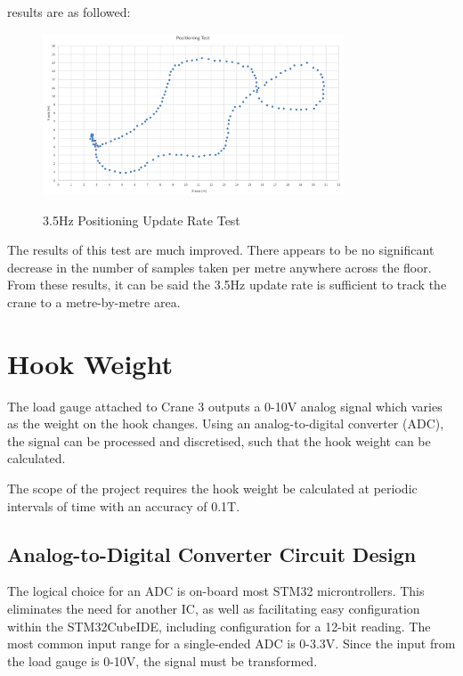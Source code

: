 \documentclass[12pt, a4paper]{article}
\begin{document}
results are as followed:
\begin{figure}[H]
    \centering
    \includegraphics[width=0.8\textwidth]{update2.png}
    \label{fig:3.5hz}
    \caption{3.5Hz Positioning Update Rate Test}
\end{figure}
The results of this test are much improved. There appears to be no significant decrease in the number of samples taken per metre anywhere across the floor.
From these results, it can be said the 3.5Hz update rate is sufficient to track the crane to a metre-by-metre area.




\newpage

\section{Hook Weight}
The load gauge attached to Crane 3 outputs a 0-10V analog signal which varies as the weight on the hook changes.
Using an analog-to-digital converter (ADC), the signal can be processed and discretised, such that the hook weight can be calculated.

The scope of the project requires the hook weight be calculated at periodic intervals of time with an accuracy of 0.1T. 
\subsection{Analog-to-Digital Converter Circuit Design}
The logical choice for an ADC is on-board most STM32 microntrollers. This eliminates the need for another IC, as well as facilitating
easy configuration within the STM32CubeIDE, including configuration for a 12-bit reading. The most common input range for a single-ended ADC 
is 0-3.3V. Since the input from the load gauge is 0-10V, the signal must be transformed. 
\end{document}
